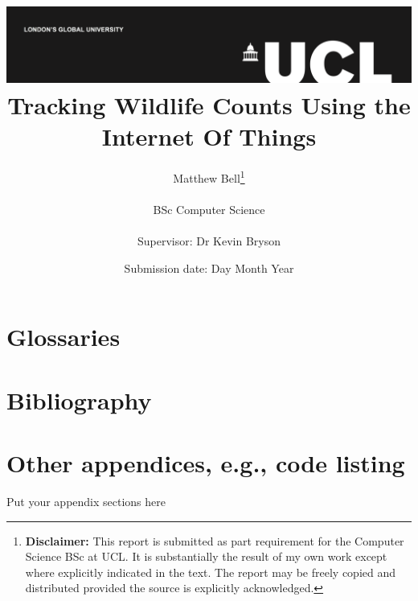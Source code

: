 \documentclass[a4paper]{report}
\title{{\vspace{-14em} \includegraphics[scale=0.4]{ucl_logo.png}}\\
{{\Huge Tracking Wildlife Counts Using the Internet Of Things}}\\
}
\date{Submission date: Day Month Year}
\author{Matthew Bell\thanks{
{\bf Disclaimer:}
This report is submitted as part requirement for the Computer Science BSc at
UCL. It is substantially the result of my own work except where explicitly
indicated in the text.
The report may be freely copied and distributed provided the source is explicitly acknowledged.}
\\ \\
BSc Computer Science\\ \\
Supervisor: Dr Kevin Bryson}
\begin{document}
 
\onehalfspacing
\maketitle
\begin{abstract}
  
\end{abstract}


\tableofcontents
\setcounter{page}{1}






\nocite{*}

\renewcommand{\chaptername}{Appendix}
\appendix

\chapter{Glossaries}
\printglossaries

\chapter{Bibliography}
\printbibliography[heading=bibempty]

\chapter{Other appendices, e.g., code listing}
Put your appendix sections here
\end{document}
